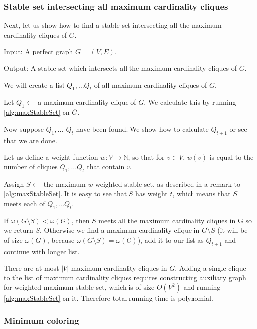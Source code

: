 \subsubsection{Stable set intersecting all maximum cardinality cliques}
Next, let us show how to find a stable set intersecting all the maximum cardinality cliques of $G$. 
\begin{alg}
  \label{alg:ssIntersectingCliques}
  Input: A perfect graph $G = (V, E)$.

  \noindent Output: A stable set which intersects all the maximum cardinality cliques of $G$.
\end{alg}
\begin{algtext}
  We will create a list $Q_1, \ldots Q_t$ of all maximum cardinality cliques of $G$.

  Let $Q_1 \leftarrow$ a maximum cardinality clique of $G$. We calculate this by running \cref{alg:maxStableSet} on $\overline{G}$.

  Now suppose $Q_1, \ldots, Q_t$ have been found. We show how to calculate $Q_{t+1}$ or see that we are done.

  Let us define a weight function $w : V \rightarrow \mathbb{N}$, so that for $v \in V$, $w(v)$ is equal to the number of cliques $Q_1, \ldots Q_t$ that contain $v$.

  Assign $S \leftarrow$ the maximum $w$-weighted stable set, as described in a remark to \cref{alg:maxStableSet}. It is easy to see that $S$ has weight $t$, which means that $S$ meets each of $Q_1, \ldots Q_t$.

  If $\omega(G \setminus S) < \omega(G)$, then $S$ meets all the maximum cardinality cliques in G so we return $S$. Otherwise we find a maximum cardinality clique in $G \setminus S$ (it will be of size $\omega(G)$, because $\omega(G \setminus S) = \omega(G)$), add it to our list as $Q_{t+1}$ and continue with longer list.

\end{algtext}

There are at most $|V|$ maximum cardinality cliques in $G$. Adding a single clique to the list of maximum cardinality cliques requires constructing auxiliary graph for weighted maximum stable set, which is of size $O(V^2)$ and running \cref{alg:maxStableSet} on it. Therefore total running time is polynomial.

\subsubsection{Minimum coloring}

